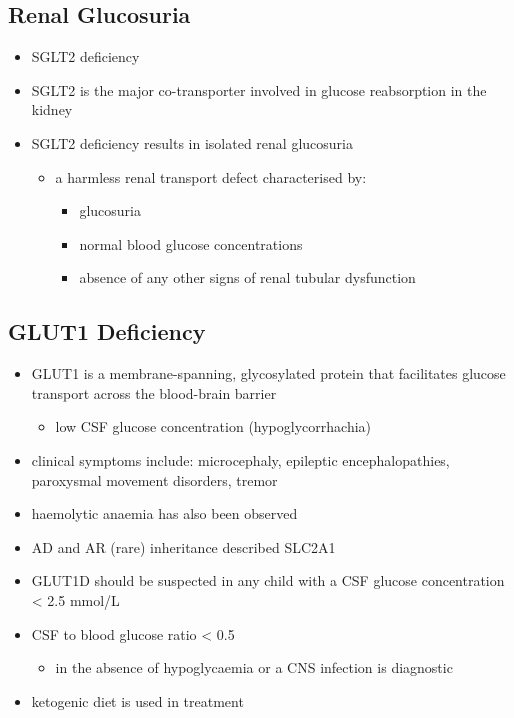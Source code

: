 \documentclass{scrartcl}
\begin{document}
\subsection{Renal Glucosuria}
\label{sec:orgd8db1d1}
\begin{itemize}
\item SGLT2 deficiency
\item SGLT2 is the major co-transporter involved in glucose reabsorption in
the kidney
\item SGLT2 deficiency results in isolated renal glucosuria
\begin{itemize}
\item a harmless renal transport defect characterised by:
\begin{itemize}
\item glucosuria
\item normal blood glucose concentrations
\item absence of any other signs of renal tubular dysfunction
\end{itemize}
\end{itemize}
\end{itemize}

\subsection{GLUT1 Deficiency}
\label{sec:org2b8966e}
\begin{itemize}
\item GLUT1 is a membrane-spanning, glycosylated protein that facilitates
glucose transport across the blood-brain barrier
\begin{itemize}
\item low CSF glucose concentration (hypoglycorrhachia)
\end{itemize}
\item clinical symptoms include: microcephaly, epileptic encephalopathies,
paroxysmal movement disorders, tremor
\item haemolytic anaemia has also been observed
\item AD and AR (rare) inheritance described SLC2A1
\item GLUT1D should be suspected in any child with a CSF glucose
concentration \textless{} 2.5 mmol/L
\item CSF to blood glucose ratio \textless{} 0.5 
\begin{itemize}
\item in the absence of hypoglycaemia or a CNS infection is diagnostic
\end{itemize}
\item ketogenic diet is used in treatment
\end{itemize}
\end{document}
